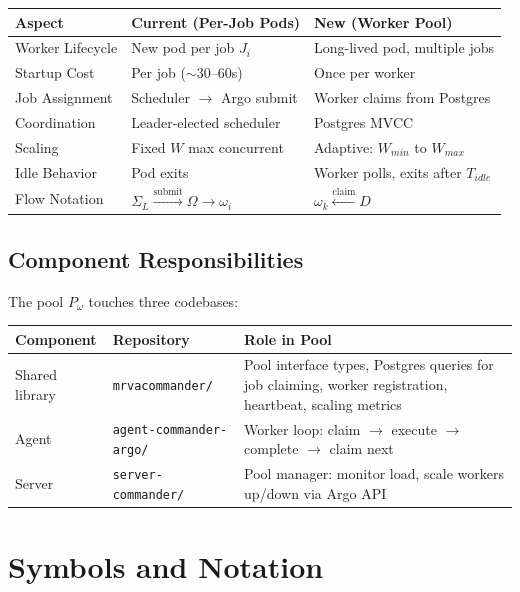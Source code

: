 \documentclass[11pt]{article}
\begin{document}
\begin{center}
\begin{tabular}{p{4cm}|p{5cm}|p{5cm}}
\toprule
\textbf{Aspect} & \textbf{Current (Per-Job Pods)} & \textbf{New (Worker Pool)} \\
\midrule
Worker Lifecycle & New pod per job $J_i$ & Long-lived pod, multiple jobs \\
Startup Cost & Per job ($\sim$30--60s) & Once per worker \\
Job Assignment & Scheduler $\to$ Argo submit & Worker claims from Postgres \\
Coordination & Leader-elected scheduler & Postgres MVCC \\
Scaling & Fixed $W$ max concurrent & Adaptive: $W_{min}$ to $W_{max}$ \\
Idle Behavior & Pod exits & Worker polls, exits after $T_{idle}$ \\
\midrule
Flow Notation & $\Sigma_L \xrightarrow{\text{submit}} \Omega \to \omega_i$ &
  $\omega_k \xleftarrow{\text{claim}} D$ \\
\bottomrule
\end{tabular}
\end{center}

\subsection{Component Responsibilities}

The pool $P_\omega$ touches three codebases:

\begin{center}
\begin{tabular}{p{4cm}p{4cm}p{6cm}}
\toprule
\textbf{Component} & \textbf{Repository} & \textbf{Role in Pool} \\
\midrule
Shared library & \texttt{mrvacommander/} & Pool interface types, Postgres queries for
  job claiming, worker registration, heartbeat, scaling metrics \\
Agent & \texttt{agent-commander-argo/} & Worker loop: claim $\to$ execute $\to$
  complete $\to$ claim next \\
Server & \texttt{server-commander/} & Pool manager: monitor load, scale
  workers up/down via Argo API \\
\bottomrule
\end{tabular}
\end{center}

\section{Symbols and Notation}
\label{sec:symbols-notation}
\end{document}
